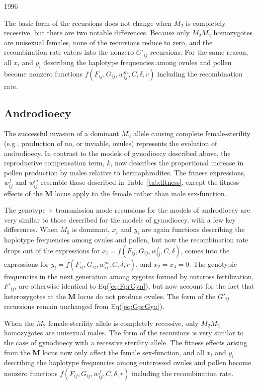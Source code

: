 1996\documentclass[9pt,twocolumn,twoside,lineno]{gsajnl}
\begin{document}
The basic form of the recursions does not change when $M_2$ is completely recessive, but there are two notable differences. Because only $M_2M_2$ homozygotes are unisexual females, none of the recursions reduce to zero, and the recombination rate enters into the nonzero $G'_{ij}$ recursions. For the same reason, all $x_i$ and $y_i$ describing the haplotype frequencies among ovules and pollen become nonzero functions $f(F_{ij},G_{ij},w^m_{ij},C,\delta,r)$ including the recombination rate.


\subsection{Androdioecy}

The successful invasion of a dominant $M_2$ allele causing complete female-sterility (e.g., production of no, or inviable, ovules) represents the evolution of androdioecy. In contrast to the models of gynodioecy described above, the reproductive compensation term, $k$, now describes the proportional increase in pollen production by males relative to hermaphrodites. The fitness expressions, $w^f_{ij}$ and $w^m_{ij}$ resemble those described in Table~\ref{tab:fitness}, except the fitness effects of the $\mathbf{M}$ locus apply to the female rather than male sex-function. 

The genotype $\times$ transmission mode recursions for the models of androdioecy are very similar to those described for the models of gynodioecy, with a few key differences. When $M_2$ is dominant, $x_{i}$ and $y_{i}$ are again functions describing the haplotype frequencies among ovules and pollen, but now the recombination rate drops out of the expressions for $x_i=f(F_{ij},G_{ij},w^f_{ij},C,\delta)$, comes into the expressions for $y_i=f(F_{ij},G_{ij},w^m_{ij},C,\delta,r)$, and $x_2=x_4=0$. The genotypic frequencies in the next generation among zygotes formed by outcross fertilization, $F'_{ij}$, are otherwise identical to Eq(\ref{eq:FprGyn}), but now account for the fact that heterozygotes at the $\mathbf{M}$ locus do not produce ovules. The form of the $G'_{ij}$ recursions remain unchanged from Eq(\ref{eq:GprGyn}).

When the $M_2$ female-sterility allele is completely recessive, only $M_2M_2$ homozygotes are unisexual males. The form of the recursions is very similar to the case of gynodioecy with a recessive sterility allele. The fitness effects arising from the $\mathbf{M}$ locus now only affect the female sex-function, and all $x_i$ and $y_i$ describing the haplotype frequencies among outcrossed ovules and pollen become nonzero functions $f(F_{ij},G_{ij},w^f_{ij},C,\delta,r)$ including the recombination rate.
\end{document}
